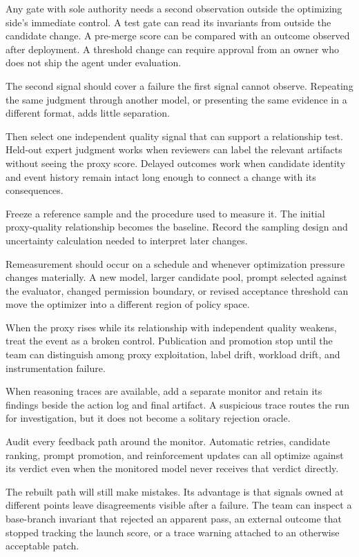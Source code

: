 Any gate with sole authority needs a second observation outside the optimizing side's immediate control. A test gate can read its invariants from outside the candidate change. A pre-merge score can be compared with an outcome observed after deployment. A threshold change can require approval from an owner who does not ship the agent under evaluation.

The second signal should cover a failure the first signal cannot observe. Repeating the same judgment through another model, or presenting the same evidence in a different format, adds little separation.

Then select one independent quality signal that can support a relationship test. Held-out expert judgment works when reviewers can label the relevant artifacts without seeing the proxy score. Delayed outcomes work when candidate identity and event history remain intact long enough to connect a change with its consequences.

Freeze a reference sample and the procedure used to measure it. The initial proxy-quality relationship becomes the baseline. Record the sampling design and uncertainty calculation needed to interpret later changes.

Remeasurement should occur on a schedule and whenever optimization pressure changes materially. A new model, larger candidate pool, prompt selected against the evaluator, changed permission boundary, or revised acceptance threshold can move the optimizer into a different region of policy space.

When the proxy rises while its relationship with independent quality weakens, treat the event as a broken control. Publication and promotion stop until the team can distinguish among proxy exploitation, label drift, workload drift, and instrumentation failure.

When reasoning traces are available, add a separate monitor and retain its findings beside the action log and final artifact. A suspicious trace routes the run for investigation, but it does not become a solitary rejection oracle.

Audit every feedback path around the monitor. Automatic retries, candidate ranking, prompt promotion, and reinforcement updates can all optimize against its verdict even when the monitored model never receives that verdict directly.

The rebuilt path will still make mistakes. Its advantage is that signals owned at different points leave disagreements visible after a failure. The team can inspect a base-branch invariant that rejected an apparent pass, an external outcome that stopped tracking the launch score, or a trace warning attached to an otherwise acceptable patch.

